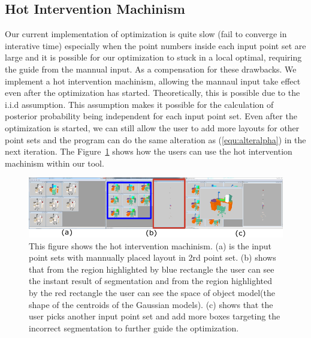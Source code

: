 \subsection{Hot Intervention Machinism}
Our current implementation of optimization is quite slow (fail to converge in interative time) especially when the point numbers inside each input point set are large and it is possible for our optimization to stuck in a local optimal, requiring the guide from the mannual input. As a compensation for these drawbacks. We implement a hot intervention machinism, allowing the mannaul input take effect even after the optimization has started. Theoretically, this is possible due to the i.i.d assumption. 
This assumption makes it possible for the calculation of posterior probability being independent for each input point set. Even after the optimization is started, we can still allow the user to add more layouts for other point sets and the program can do the same alteration as (\ref{equ:alteralpha}) in the next iteration. The Figure~\ref{fig:hi} shows how the users can use the hot intervention machinism within our tool.
\begin{figure}[htb]
	\centering
	\includegraphics[width=\linewidth]{images/hotintervention/hi}
	\caption{\label{fig:hi}This figure shows the hot intervention machinism. (a) is the input point sets with mannually placed layout in 2rd point set. (b) shows that from the region highlighted by blue rectangle the user can see the instant result of segmentation and from the region highlighted by the red rectangle the user can see the space of object model(the shape of the centroids of the Gaussian models). (c) shows that the user picks another input point set and add more boxes targeting the incorrect segmentation to further guide the optimization.}
\end{figure}
 